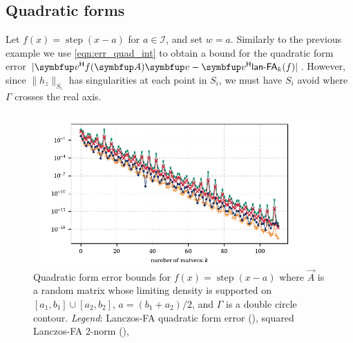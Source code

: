\subsection{Quadratic forms}
\label{ex:quadform_step}

Let \( f(x) = \operatorname{step}(x-a) \) for  \( a \in \mathcal{I} \), and set $w = a$.
Similarly to the previous example we use \cref{eqn:err_quad_int} to obtain a bound for the quadratic form error $| \vec{v}^\cT \fA\vec{v} - \vec{v}^\cT \lan_k(f)|$. 
However, since \( \| h_z \|_{S_i} \) has singularities at each point in \( S_i \), we must have $S_i$ avoid where $\Gamma$ crosses the real axis.

\begin{figure}[ht]
    \begin{center}
        \includegraphics{imgs/ch7_step_qf.pdf} 
    \end{center}
    \caption[{Quadratic form error bounds for \( f(x) = \operatorname{step}(x-a) \) where \( \vec{A} \) is a random matrix whose limiting density is supported on \( [a_1,b_1]\cup[a_2,b_2] \), $a = (b_1+a_2)/2$, and \( \Gamma \) is a double circle contour.}]{%
    Quadratic form error bounds for \( f(x) = \operatorname{step}(x-a) \) where \( \vec{A} \) is a random matrix whose limiting density is supported on \( [a_1,b_1]\cup[a_2,b_2] \), $a = (b_1+a_2)/2$, and \( \Gamma \) is a double circle contour. 
    \hspace{.25em}\emph{Legend}:
    Lanczos-FA quadratic form error 
    ({\protect{}}), 
    squared Lanczos-FA 2-norm ({\protect{}}),
}
\end{figure}
